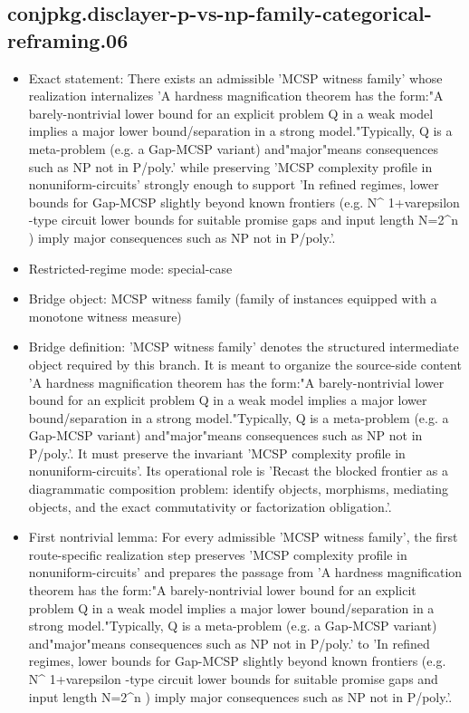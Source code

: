 \documentclass[11pt]{article}
\begin{document}
\subsection*{conjpkg.disclayer-p-vs-np-family-categorical-reframing.06}
\begin{itemize}
\item Exact statement: There exists an admissible 'MCSP witness family' whose realization internalizes 'A hardness magnification theorem has the form:"A barely-nontrivial lower bound for an explicit problem Q in a weak model implies a major lower bound/separation in a strong model."Typically, Q is a meta-problem (e.g. a Gap-MCSP variant) and"major"means consequences such as NP not in P/poly.' while preserving 'MCSP complexity profile in nonuniform-circuits' strongly enough to support 'In refined regimes, lower bounds for Gap-MCSP slightly beyond known frontiers (e.g. N\textasciicircum{} 1+varepsilon -type circuit lower bounds for suitable promise gaps and input length N=2\textasciicircum{}n ) imply major consequences such as NP not in P/poly.'.
\item Restricted-regime mode: special-case
\item Bridge object: MCSP witness family (family of instances equipped with a monotone witness measure)
\item Bridge definition: 'MCSP witness family' denotes the structured intermediate object required by this branch. It is meant to organize the source-side content 'A hardness magnification theorem has the form:"A barely-nontrivial lower bound for an explicit problem Q in a weak model implies a major lower bound/separation in a strong model."Typically, Q is a meta-problem (e.g. a Gap-MCSP variant) and"major"means consequences such as NP not in P/poly.'. It must preserve the invariant 'MCSP complexity profile in nonuniform-circuits'. Its operational role is 'Recast the blocked frontier as a diagrammatic composition problem: identify objects, morphisms, mediating objects, and the exact commutativity or factorization obligation.'.
\item First nontrivial lemma: For every admissible 'MCSP witness family', the first route-specific realization step preserves 'MCSP complexity profile in nonuniform-circuits' and prepares the passage from 'A hardness magnification theorem has the form:"A barely-nontrivial lower bound for an explicit problem Q in a weak model implies a major lower bound/separation in a strong model."Typically, Q is a meta-problem (e.g. a Gap-MCSP variant) and"major"means consequences such as NP not in P/poly.' to 'In refined regimes, lower bounds for Gap-MCSP slightly beyond known frontiers (e.g. N\textasciicircum{} 1+varepsilon -type circuit lower bounds for suitable promise gaps and input length N=2\textasciicircum{}n ) imply major consequences such as NP not in P/poly.'.

\end{itemize}
\end{document}
